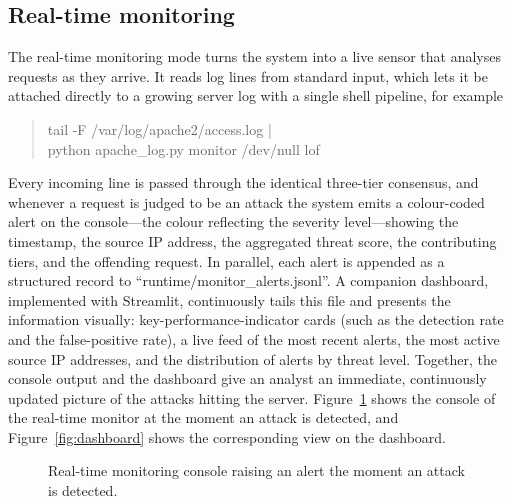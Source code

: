 \documentclass[12pt,a4paper]{report}
\begin{document}
\subsection{Real-time monitoring}

The real-time monitoring mode turns the system into a live sensor that
analyses requests as they arrive. It reads log lines from standard input,
which lets it be attached directly to a growing server log with a single
shell pipeline, for example
\begin{quote}\footnotesize\ttfamily
tail -F /var/log/apache2/access.log |\\
\hspace*{1.5em}python apache\_log.py monitor /dev/null lof
\end{quote}
Every incoming line is passed through the identical
three-tier consensus, and whenever a request is judged to be an attack the
system emits a colour-coded alert on the console---the colour reflecting the
severity level---showing the timestamp, the source IP address, the aggregated
threat score, the contributing tiers, and the offending request. In parallel,
each alert is appended as a structured record to
``runtime/monitor\_alerts.jsonl''. A companion dashboard, implemented
with Streamlit, continuously tails this file and presents the information
visually: key-performance-indicator cards (such as the detection rate and the
false-positive rate), a live feed of the most recent alerts, the most active
source IP addresses, and the distribution of alerts by threat level. Together,
the console output and the dashboard give an analyst an immediate, continuously
updated picture of the attacks hitting the server.
Figure~\ref{fig:alert-monitor} shows the console of the real-time monitor at
the moment an attack is detected, and Figure~\ref{fig:dashboard} shows the
corresponding view on the dashboard.

\begin{figure}[ht]
  \centering
  \caption{Real-time monitoring console raising an alert the moment an attack
           is detected.}
  \label{fig:alert-monitor}
\end{figure}
\end{document}
